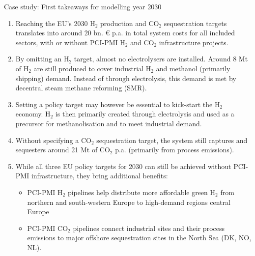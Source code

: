 \documentclass[10pt,aspectratio=169,dvipsnames]{beamer}
\begin{document}
\begin{frame}{Case study: First takeaways for modelling year 2030}
  \footnotesize
  \begin{enumerate}
    \setlength\itemsep{0.3em}
      \item Reaching the EU's 2030 H$_2$ production and CO$_2$ sequestration targets translates into around \alert{20 bn. € p.a. in total system costs} for all included sectors, with or without PCI-PMI H$_2$ and CO$_2$ infrastructure projects.
      \item By omitting an H$_2$ target, almost no electrolysers are installed. \alert{Around 8 Mt of H$_2$} are still produced to cover industrial H$_2$ and methanol (primarily shipping) demand. Instead of through electrolysis, this demand is met by decentral steam methane reforming (SMR). 
      \item Setting a policy target may however be essential to \alert{kick-start the H$_2$ economy}. H$_2$ is then primarily created through electrolysis and used as a \alert{precursor} for methanolisation and to meet industrial demand. 
      \item Without specifying a CO$_2$ sequestration target, the system still captures and sequesters \alert{around 21 Mt of CO$_2$ p.a.} (primarily from process emissions).
      \item While all three \alert{EU policy targets for 2030 can still be achieved} without PCI-PMI infrastructure, they bring additional benefits:
      \begin{itemize}
        \footnotesize
        \item PCI-PMI H$_2$ pipelines help distribute more \alert{affordable green H$_2$} from northern and south-western Europe to high-demand regions central Europe
        \item PCI-PMI CO$_2$ pipelines connect \alert{industrial sites} and their process emissions to \alert{major offshore sequestration sites in the North Sea} (DK, NO, NL).
      \end{itemize}
  \end{enumerate}

\end{frame}
\end{document}
